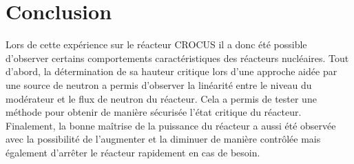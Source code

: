 \section{Conclusion}
Lors de cette expérience sur le réacteur CROCUS il a donc été possible d'observer certains comportements caractéristiques des réacteurs nucléaires. Tout d'abord, la détermination de sa hauteur critique lors d'une approche aidée par une source de neutron a permis d'observer la linéarité entre le niveau du modérateur et le flux de neutron du réacteur. Cela a permis de tester une méthode pour obtenir de manière sécurisée l'état critique du réacteur. Finalement, la bonne maîtrise de la puissance du réacteur a aussi été observée avec la possibilité de l'augmenter et la diminuer de manière contrôlée mais également d'arrêter le réacteur rapidement en cas de besoin.